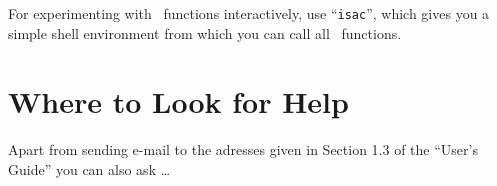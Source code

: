 For experimenting with \saclib\ functions interactively, use ``{\tt isac}'',
which gives you a simple shell environment from which you can call all
\saclib\ functions.


\section{Where to Look for Help}

Apart from sending e-mail to the adresses given in Section 1.3 of the ``User's
Guide'' you can also ask \ldots



